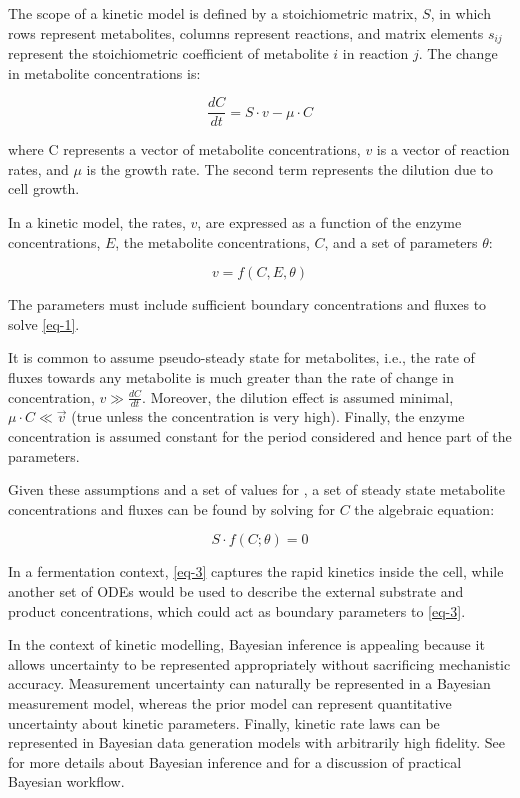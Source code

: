 \documentclass[journal=asbcd6,manuscript=article,layout=traditional]{achemso}
\begin{document}
The scope of a kinetic model is defined by a stoichiometric matrix,
\(S\), in which rows represent metabolites, columns represent reactions,
and matrix elements \(s_{ij}\) represent the stoichiometric coefficient
of metabolite \(i\) in reaction \(j\). The change in metabolite
concentrations is:

\begin{equation}\label{eq-1}
\frac{dC}{dt} = S\cdot v - \mu\cdot C 
\end{equation}

where C represents a vector of metabolite concentrations, \(v\) is a
vector of reaction rates, and \(\mu\) is the growth rate. The second
term represents the dilution due to cell growth.

In a kinetic model, the rates, \(v\), are expressed as a function of the
enzyme concentrations, \(E\), the metabolite concentrations, \(C\), and
a set of parameters \(\theta\):

\begin{equation}\label{eq-2}
v = f(C, E, \theta)
\end{equation}

The parameters must include sufficient boundary concentrations and
fluxes to solve \eqref{eq-1}.

It is common to assume pseudo-steady state for metabolites, i.e., the
rate of fluxes towards any metabolite is much greater than the rate of
change in concentration, \(𝑣 \gg \frac{𝑑𝐶}{𝑑𝑡}\). Moreover, the dilution
effect is assumed minimal, \(\mu\cdot C \ll \vec{v}\) (true unless the
concentration is very high). Finally, the enzyme concentration is
assumed constant for the period considered and hence part of the
parameters.

Given these assumptions and a set of values for \theta, a set of steady
state metabolite concentrations and fluxes can be found by solving for
\(C\) the algebraic equation:

\begin{equation}\label{eq-3}
S\cdot f(C;\theta) = 0
\end{equation}

In a fermentation context, \eqref{eq-3} captures the rapid kinetics
inside the cell, while another set of ODEs would be used to describe the
external substrate and product concentrations, which could act as
boundary parameters to \eqref{eq-3}.

In the context of kinetic modelling, Bayesian inference is appealing
because it allows uncertainty to be represented appropriately without
sacrificing mechanistic accuracy. Measurement uncertainty can naturally
be represented in a Bayesian measurement model, whereas the prior model
can represent quantitative uncertainty about kinetic parameters.
Finally, kinetic rate laws can be represented in Bayesian data
generation models with arbitrarily high fidelity. See
\citet{gelmanBayesianDataAnalysis2020a} for more details about Bayesian
inference and \citet{gelmanBayesianWorkflow2020} for a discussion of
practical Bayesian workflow.
\end{document}
